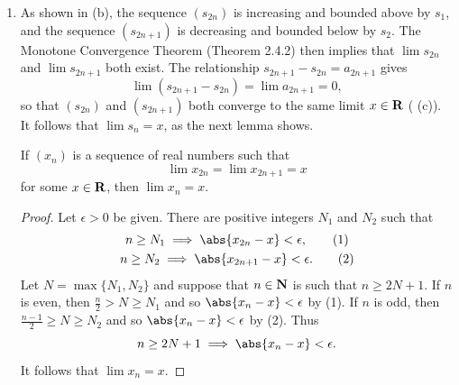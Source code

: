 \documentclass{lew98_solutions}
\begin{document}
\begin{solution}
\begin{enumerate}
        \item As shown in (b), the sequence \( (s_{2n}) \) is increasing and bounded above by \( s_1 \), and the sequence \( (s_{2n+1}) \) is decreasing and bounded below by \( s_2 \). The Monotone Convergence Theorem (Theorem 2.4.2) then implies that \( \lim s_{2n} \) and \( \lim s_{2n+1} \) both exist. The relationship \( s_{2n+1} - s_{2n} = a_{2n+1} \) gives
        \[
            \lim (s_{2n+1} - s_{2n}) = \lim a_{2n+1} = 0,
        \]
        so that \( (s_{2n}) \) and \( (s_{2n+1}) \) both converge to the same limit \( x \in \mathbf{R} \) ( (c)). It follows that \( \lim s_n = x \), as the next lemma shows.
        \begin{lemma}
        \label{lem:ex2.7.1}
            If \( (x_n) \) is a sequence of real numbers such that
            \[
                \lim x_{2n} = \lim x_{2n+1} = x
            \]
            for some \( x \in \mathbf{R} \), then \( \lim x_n = x \).
        \end{lemma}
        \begin{proof}
            Let \( \epsilon > 0 \) be given. There are positive integers \( N_1 \) and \( N_2 \) such that
            \begin{gather*}
                n \geq N_1 \implies \abs{x_{2n} - x} < \epsilon, \tag{1} \\
                n \geq N_2 \implies \abs{x_{2n+1} - x} < \epsilon. \tag{2}
            \end{gather*}
            Let \( N = \max \{ N_1, N_2 \} \) and suppose that \( n \in \mathbf{N} \) is such that \( n \geq 2N + 1 \). If \( n \) is even, then \( \tfrac{n}{2} > N \geq N_1 \) and so \( \abs{x_n - x} < \epsilon \) by (1). If \( n \) is odd, then \( \tfrac{n-1}{2} \geq N \geq N_2 \) and so \( \abs{x_n - x} < \epsilon \) by (2). Thus
            \[
                n \geq 2N + 1 \implies \abs{x_n - x} < \epsilon.
            \]
            It follows that \( \lim x_n = x \).
        \end{proof}
    \end{enumerate}
\end{solution}
\end{document}
